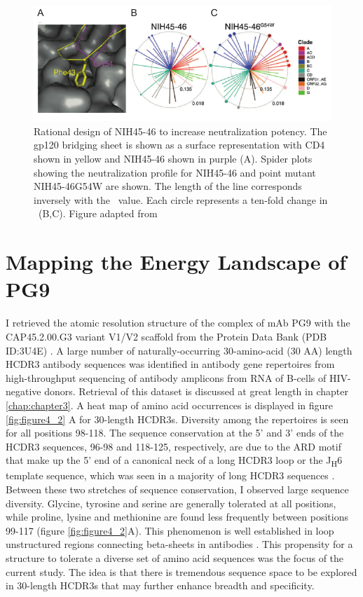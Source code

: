 \begin{figure}
   \centering
   \includegraphics{images/chapter4/figure4_1.pdf} %
   \caption[Rational Design of NIH45-46 to Increase Neutralization Potency]{Rational design of NIH45-46 to increase neutralization potency. The gp120 bridging sheet is shown as a surface representation with CD4 shown in yellow and NIH45-46 shown in purple (A). Spider plots showing the neutralization profile for NIH45-46 and point mutant NIH45-46G54W are shown. The length of the line corresponds inversely with the \ic~value. Each circle represents a ten-fold change in \ic~(B,C). Figure adapted from \citep{Diskin:2011hl}}
   \label{fig:figure4_1}
\end{figure}

\section{Mapping the Energy Landscape of PG9}
\label{sec:mapping}
I retrieved the atomic resolution structure of the complex of mAb PG9 with the CAP45.2.00.G3 variant V1/V2 scaffold from the Protein Data Bank (PDB ID:3U4E) \citep{McLellan:2011dg}. A large number of naturally-occurring 30-amino-acid (30 AA) length HCDR3 antibody sequences was identified in antibody gene repertoires from high-throughput sequencing of antibody amplicons from RNA of B-cells of HIV-negative donors. Retrieval of this dataset is discussed at great length in chapter \ref{chap:chapter3}. A heat map of amino acid occurrences is displayed in figure \ref{fig:figure4_2} A for 30-length HCDR3s. Diversity among the repertoires is seen for all positions 98-118. The sequence conservation at the 5' and 3' ends of the HCDR3 sequences, 96-98 and 118-125, respectively, are due to the ARD motif that make up the 5' end of a canonical neck of a long HCDR3 loop or the J\textsubscript{H}6 template sequence, which was seen in a majority of long HCDR3 sequences \citep{North:2011dv,Briney:2012ib}. Between these two stretches of sequence conservation, I observed large sequence diversity. Glycine, tyrosine and serine are generally tolerated at all positions, while proline, lysine and methionine are found less frequently between positions 99-117 (figure \ref{fig:figure4_2}A). This phenomenon is well established in loop unstructured regions connecting beta-sheets in antibodies \citep{Minuchehr:2005wc,De:2005in}.  This propensity for a structure to tolerate a diverse set of amino acid sequences was the focus of the current study. The idea is that there is tremendous sequence space to be explored in 30-length HCDR3s that may further enhance breadth and specificity.

